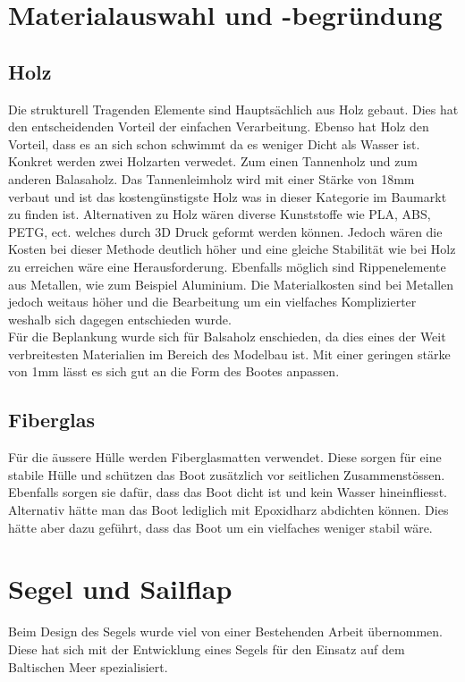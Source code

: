 \section{Materialauswahl und -begründung }
\subsection{Holz}
Die strukturell Tragenden Elemente sind Hauptsächlich aus Holz gebaut. Dies hat den entscheidenden Vorteil der einfachen Verarbeitung. Ebenso hat Holz den Vorteil, dass es an sich schon schwimmt da es weniger Dicht als Wasser ist. Konkret werden zwei Holzarten verwedet. Zum einen Tannenholz und zum anderen Balasaholz. Das Tannenleimholz wird mit einer Stärke von 18mm verbaut und ist das kostengünstigste Holz was in dieser Kategorie im Baumarkt zu finden ist.
Alternativen zu Holz wären diverse Kunststoffe wie PLA, ABS, PETG, ect. welches durch 3D Druck geformt werden können. Jedoch wären die Kosten bei dieser Methode deutlich höher und eine gleiche Stabilität wie bei Holz zu erreichen wäre eine Herausforderung.
Ebenfalls möglich sind Rippenelemente aus Metallen, wie zum Beispiel Aluminium. Die Materialkosten sind bei Metallen jedoch weitaus höher und die Bearbeitung um ein vielfaches Komplizierter weshalb sich dagegen entschieden wurde.
\\
Für die Beplankung wurde sich für Balsaholz enschieden, da dies eines der Weit verbreitesten Materialien im Bereich des Modelbau ist. Mit einer geringen stärke von 1mm lässt es sich gut an die Form des Bootes anpassen.

\subsection{Fiberglas}
Für die äussere Hülle werden Fiberglasmatten verwendet. Diese sorgen für eine stabile Hülle und schützen das Boot zusätzlich vor seitlichen Zusammenstössen. Ebenfalls sorgen sie dafür, dass das Boot dicht ist und kein Wasser hineinfliesst. Alternativ hätte man das Boot lediglich mit Epoxidharz abdichten können. Dies hätte aber dazu geführt, dass das Boot um ein vielfaches weniger stabil wäre. 

\section{Segel und Sailflap}
Beim Design des Segels wurde viel von einer Bestehenden Arbeit übernommen. Diese hat sich mit der Entwicklung eines Segels für den Einsatz auf dem Baltischen Meer spezialisiert.




